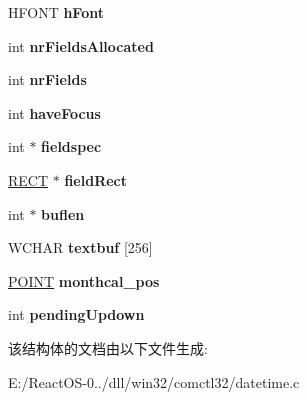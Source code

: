 \begin{DoxyCompactItemize}
H\+F\+O\+NT {\bfseries h\+Font}
\item 
\mbox{\label{struct_d_a_t_e_t_i_m_e___i_n_f_o_a05933cc078d0631fb09dc33d6fa853bb}} 
int {\bfseries nr\+Fields\+Allocated}
\item 
\mbox{\label{struct_d_a_t_e_t_i_m_e___i_n_f_o_ae73d7bddfefe243b0f23212d40c2fb97}} 
int {\bfseries nr\+Fields}
\item 
\mbox{\label{struct_d_a_t_e_t_i_m_e___i_n_f_o_a2fce0906491d26d71cd03bf8ca311f49}} 
int {\bfseries have\+Focus}
\item 
\mbox{\label{struct_d_a_t_e_t_i_m_e___i_n_f_o_a5cb07aea4cbda92c8c8a6fb86d1fec66}} 
int $\ast$ {\bfseries fieldspec}
\item 
\mbox{\label{struct_d_a_t_e_t_i_m_e___i_n_f_o_aaf9cebd4f3d6cb03abf9b97733c96a3d}} 
\hyperlink{structtag_r_e_c_t}{R\+E\+CT} $\ast$ {\bfseries field\+Rect}
\item 
\mbox{\label{struct_d_a_t_e_t_i_m_e___i_n_f_o_afa51cbecf916718f894683624ed20f65}} 
int $\ast$ {\bfseries buflen}
\item 
\mbox{\label{struct_d_a_t_e_t_i_m_e___i_n_f_o_a5cf5bceb8548b26b4b95bf3503d6ebce}} 
W\+C\+H\+AR {\bfseries textbuf} \mbox{[}256\mbox{]}
\item 
\mbox{\label{struct_d_a_t_e_t_i_m_e___i_n_f_o_a635c9ee4c2beb74c9d65d4a49028b153}} 
\hyperlink{structtag_p_o_i_n_t}{P\+O\+I\+NT} {\bfseries monthcal\+\_\+pos}
\item 
\mbox{\label{struct_d_a_t_e_t_i_m_e___i_n_f_o_a92c9a1adaee3c7ff7477a15b9c936056}} 
int {\bfseries pending\+Updown}
\end{DoxyCompactItemize}


该结构体的文档由以下文件生成\+:\begin{DoxyCompactItemize}
\item 
E\+:/\+React\+O\+S-\/0../dll/win32/comctl32/datetime.\+c\end{DoxyCompactItemize}
